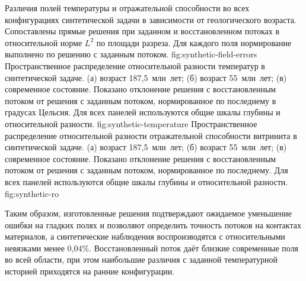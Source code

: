  {Различия полей температуры и отражательной способности во всех конфигурациях синтетической задачи в зависимости от геологического возраста. Сопоставлены прямые решения при заданном и восстановленном потоках в относительной норме $L^2$ по площади разреза. Для каждого поля нормирование выполнено по решению с заданным потоком.} {fig:synthetic-field-errors}
 {Пространственное распределение относительной разности температур в синтетической задаче. (а) возраст 187,5~млн~лет; (б) возраст 55~млн~лет; (в) современное состояние. Показано отклонение решения с восстановленным потоком от решения с заданным потоком, нормированное по последнему в градусах Цельсия. Для всех панелей используются общие шкалы глубины и относительной разности.} {fig:synthetic-temperature}
 {Пространственное распределение относительной разности отражательной способности витринита в синтетической задаче. (а) возраст 187,5~млн~лет; (б) возраст 55~млн~лет; (в) современное состояние. Показано отклонение решения с восстановленным потоком от решения с заданным потоком, нормированное по последнему. Для всех панелей используются общие шкалы глубины и относительной разности.} {fig:synthetic-ro}

Таким образом, изготовленные решения подтверждают ожидаемое уменьшение ошибки на гладких полях и позволяют определить точность потоков на контактах материалов, а синтетические наблюдения воспроизводятся с относительными невязками менее 0,04\%. Восстановленный поток даёт близкие современные поля во всей области, при этом наибольшие различия с заданной температурной историей приходятся на ранние конфигурации.
